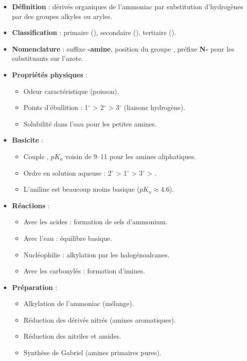 \begin{synthese}
\begin{itemize}
    \item \textbf{Définition} : dérivés organiques de l'ammoniac  par substitution d'hydrogènes par des groupes alkyles ou aryles.
    \item \textbf{Classification} : primaire (), secondaire (), tertiaire ().
    \item \textbf{Nomenclature} : suffixe \textbf{-amine}, position du groupe , préfixe \textbf{N-} pour les substituants sur l'azote.
    \item \textbf{Propriétés physiques} : 
    \begin{itemize}
        \item Odeur caractéristique (poisson).
        \item Points d'ébullition : 1$^\circ$ > 2$^\circ$ > 3$^\circ$ (liaisons hydrogène).
        \item Solubilité dans l'eau pour les petites amines.
    \end{itemize}
    \item \textbf{Basicite} : 
    \begin{itemize}
        \item Couple , $pK_a$ voisin de \numrange{9}{11} pour les amines aliphatiques.
        \item Ordre en solution aqueuse : 2$^\circ$ > 1$^\circ$ > 3$^\circ$ > .
        \item L'aniline est beaucoup moins basique ($pK_a \approx \num{4.6}$).
    \end{itemize}
    \item \textbf{Réactions} :
    \begin{itemize}
        \item Avec les acides : formation de sels d'ammonium.
        \item Avec l'eau : équilibre basique.
        \item Nucléophilie : alkylation par les halogénoalcanes.
        \item Avec les carbonylés : formation d'imines.
    \end{itemize}
    \item \textbf{Préparation} :
    \begin{itemize}
        \item Alkylation de l'ammoniac (mélange).
        \item Réduction des dérivés nitrés (amines aromatiques).
        \item Réduction des nitriles et amides.
        \item Synthèse de Gabriel (amines primaires pures).
    \end{itemize}
\end{itemize}


\end{synthese}
